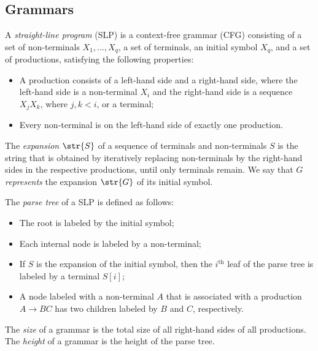 \subsection{Grammars}
\begin{definition}
A \emph{straight-line program} (SLP)  is a context-free grammar (CFG) consisting of a set of non-terminals $X_1, \ldots, X_q$, a set of terminals, an initial symbol $X_q$, and a set of productions, satisfying the following properties:
\begin{itemize}
\item A production consists of a left-hand side and a right-hand side, where the left-hand side is a non-terminal $X_i$ and the right-hand side is a sequence $X_jX_k$, where $j,k < i$, or a terminal;
\item Every non-terminal is on the left-hand side of exactly one production.
\end{itemize}
\end{definition}


The \emph{expansion} $\str{S}$ of a sequence of terminals and non-terminals $S$ is the string that is obtained by iteratively replacing non-terminals by the right-hand sides in the respective productions, until only terminals remain. We say that $G$ \emph{represents} the expansion $\str{G}$ of its initial symbol.

\begin{definition}
 The \emph{parse tree} of a SLP is defined as follows: 
\begin{itemize}
\item The root is labeled by the initial symbol;
\item Each internal node is labeled by a non-terminal;
\item If $S$ is the expansion of the initial symbol, then the $i^{\text{th}}$ leaf of the parse tree is labeled by a terminal $S[i]$;
\item A node labeled with a non-terminal $A$ that is associated with a production $A\rightarrow BC$ has two children labeled by $B$ and $C$, respectively.
\end{itemize}
\end{definition}

The \emph{size} of a grammar is the total size of all right-hand sides of all productions. The \emph{height} of a grammar is the height of the parse tree.  

